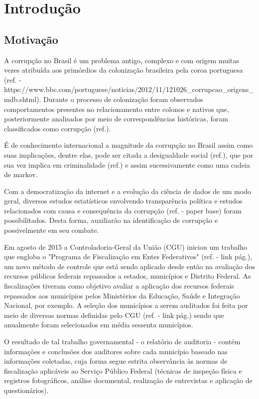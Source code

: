 \chapter{Introdução}
\label{cap:introducao}

\section{Motivação}
\label{sec:motivacao}

A corrupção no Brasil é um problema antigo, complexo e com origem muitas vezes atribuída aos primórdios da colonização brasileira pela coroa portuguesa (ref. - https://www.bbc.com/portuguese/noticias/2012/11/121026_corrupcao_origens_mdb.shtml). Durante o processo de colonização foram observados comportamentos presentes no relacionamento entre colonos e nativos que, posteriormente analisados por meio de correspondências históricas, foram classificados como corrupção (ref.).

É de conhecimento internacional a magnitude da corrupção no Brasil assim como suas implicações, dentre elas, pode ser citada a desigualdade social (ref.), que por sua vez implica em criminalidade (ref.) e assim sucessivamente como uma cadeia de markov.

Com a democratização da internet e a evolução da ciência de dados de um modo geral, diversos estudos estatísticos envolvendo transparência política e estudos relacionados com causa e consequência da corrupção (ref. - paper base) foram possibilitados. Desta forma, auxiliarão na identificação de corrupção e possivelmente em seu combate.

Em agosto de 2015 a Controladoria-Geral da União (CGU) iniciou um trabalho que engloba o "Programa de Fiscalização em Entes Federativos" (ref. - link pág.), um novo método de controle que está sendo aplicado desde então na avaliação dos recursos públicos federais repassados a estados, municípios e Distrito Federal. As fiscalizações tiveram como objetivo avaliar a aplicação dos recursos federais repassados aos municípios pelos Ministérios da Educação, Saúde e Integração Nacional, por exemplo. A seleção dos municípios a serem auditados foi feita por meio de diversas normas definidas pelo CGU (ref. - link pág.) sendo que anualmente foram selecionados em média sessenta municípios.

O resultado de tal trabalho governamental - o relatório de auditoria - contém informações e conclusões dos auditores sobre cada município baseado nas informações coletadas, cuja forma segue estrita observância às normas de fiscalização aplicáveis ao Serviço Público Federal (técnicas de inspeção física e registros fotográficos, análise documental, realização de entrevistas e aplicação de questionários).

